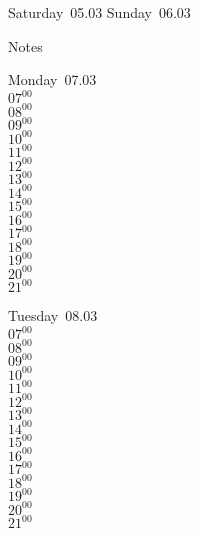 \documentclass[11pt,a4paper]{book}\usepackage[]{graphicx}\usepackage[]{color}
\begin{document}
\begin{weekendbox}
  Saturday~05.03
  \tcblower
  Sunday~06.03
\end{weekendbox} %
\begin{notebox}
  Notes
\end{notebox}
\clearpage
\begin{headerbox}
\end{headerbox}
\begin{weekdaybox}
  Monday~07.03\\
  { 
  \vfill
  $07^{00}$\\
$08^{00}$\\
$09^{00}$\\
$10^{00}$\\
$11^{00}$\\
$12^{00}$\\
$13^{00}$\\
$14^{00}$\\
$15^{00}$\\
$16^{00}$\\
$17^{00}$\\
$18^{00}$\\
$19^{00}$\\
$20^{00}$\\
$21^{00}$\\
  }
\end{weekdaybox}
\begin{weekdaybox}
  Tuesday~08.03\\
  { 
  \vfill
  $07^{00}$\\
$08^{00}$\\
$09^{00}$\\
$10^{00}$\\
$11^{00}$\\
$12^{00}$\\
$13^{00}$\\
$14^{00}$\\
$15^{00}$\\
$16^{00}$\\
$17^{00}$\\
$18^{00}$\\
$19^{00}$\\
$20^{00}$\\
$21^{00}$\\
  }
\end{weekdaybox}
\end{document}
